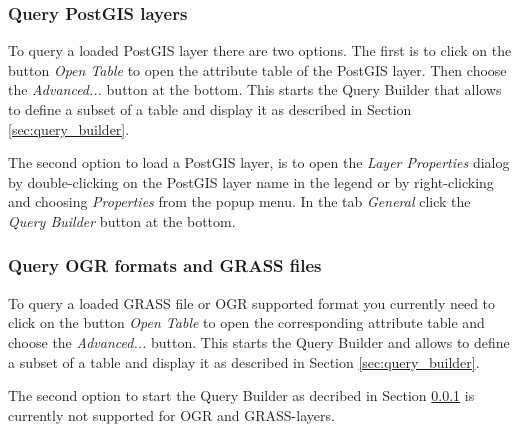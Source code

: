\subsubsection{Query PostGIS layers}\label{sec:query_builder_postgis}

To query a loaded PostGIS layer there are two options. The first is to click on the 
button \textit{Open Table} to open the attribute table of the PostGIS layer. Then 
choose the \textit{Advanced...} button at the bottom. This starts the Query Builder 
that allows to define a subset of a table and display it as described in Section 
\ref{sec:query_builder}.

The second option to load a PostGIS layer, is to open the \textit{Layer Properties} 
dialog by double-clicking on the PostGIS layer name in the legend or 
by right-clicking and choosing \textit{Properties} from the popup menu. In the tab 
\textit{General} click the \textit{Query Builder} button at the bottom.

\subsubsection{Query OGR formats and GRASS files}\label{sec:query_builder_ogrgrass}

To query a loaded GRASS file or OGR supported format you currently need to click on the 
button \textit{Open Table} to open the corresponding attribute table and choose the 
\textit{Advanced...} button. This starts the Query Builder and allows to define a 
subset of a table and display it as described in Section \ref{sec:query_builder}. 

The second option to start the Query Builder as decribed in Section 
\ref{sec:query_builder_postgis} is currently not supported for OGR and GRASS-layers.

